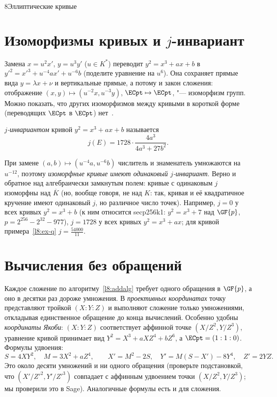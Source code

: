 \begin{lecture}{8}{Эллиптические кривые}
\section{Изоморфизмы кривых и $j$-инвариант}

Замена $x = u^2 x'$, $y = u^3 y'$ ($u \in K^*$) переводит $y^2 = x^3 + ax + b$ в
$y'^2 = x'^3 + u^{-4} a x' + u^{-6} b$ (поделите уравнение на $u^6$). Она сохраняет прямые
вида $y = \lambda x + \nu$ и вертикальные прямые, а потому и закон сложения: отображение
$(x, y) \mapsto (u^{-2}x, u^{-3}y)$, $\ECpt \mapsto \ECpt$, "--- изоморфизм групп. Можно
показать, что других изоморфизмов между кривыми в короткой форме (переводящих $\ECpt$ в $\ECpt$)
нет~\cite[разд.~2.7]{washington}.

\begin{definition}
\emph{$j$-инвариантом} кривой $y^2 = x^3 + ax + b$ называется
\[
  j(E) = 1728 \cdot \frac{4a^3}{4a^3 + 27b^2}.
\]
\end{definition}

При замене $(a, b) \mapsto (u^{-4} a, u^{-6} b)$ числитель и знаменатель умножаются на
$u^{-12}$, поэтому \emph{изоморфные кривые имеют одинаковый $j$-инвариант}. Верно и обратное
над алгебраически замкнутым полем: кривые с одинаковым $j$ изоморфны над $\overline K$ (но,
вообще говоря, не над $K$: так, кривая и её квадратичное кручение имеют одинаковый $j$, но
различное число точек). Например, $j = 0$ у всех кривых $y^2 = x^3 + b$ (к ним относится
secp256k1: $y^2 = x^3 + 7$ над $\GF{p}$, $p = 2^{256} - 2^{32} - 977$), $j = 1728$ у всех кривых
$y^2 = x^3 + ax$; для кривой примера~\ref{l8:ex-q} $j = \frac{54000}{11}$.


\section{Вычисления без обращений}

Каждое сложение по алгоритму~\ref{l8:addalg} требует одного обращения в $\GF{p}$, а оно
в десятки раз дороже умножения. В \emph{проективных координатах} точку представляют тройкой
$(X : Y : Z)$ и выполняют сложение только умножениями, откладывая единственное обращение до
конца вычислений. Особенно удобны \emph{координаты Якоби}: $(X : Y : Z)$ соответствует аффинной
точке $(X/Z^2, Y/Z^3)$, уравнение кривой принимает вид $Y^2 = X^3 + aXZ^4 + bZ^6$, а
$\ECpt = (1 : 1 : 0)$. Формулы удвоения:
\[
  S = 4XY^2, \quad M = 3X^2 + aZ^4, \qquad
  X' = M^2 - 2S, \quad Y' = M(S - X') - 8Y^4, \quad Z' = 2YZ.
\]
Это около десяти умножений и ни одного обращения (проверьте подстановкой, что
$(X'/Z'^2, Y'/Z'^3)$ совпадает с аффинным удвоением точки $(X/Z^2, Y/Z^3)$; мы проверили это
в Sage). Аналогичные формулы есть и для сложения.


\end{lecture}
